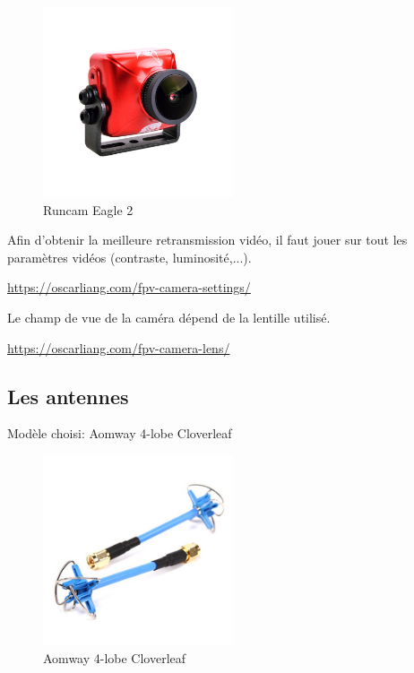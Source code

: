 \documentclass[a4paper, 11pt]{report}
\begin{document}
\begin{figure}[h]
	\begin{center}
		\includegraphics[width=0.5\textwidth]{images/camera.jpg}
		\caption{Runcam Eagle 2}
	\end{center}
\end{figure}

Afin d'obtenir la meilleure retransmission vidéo, il faut jouer sur tout les paramètres vidéos (contraste, luminosité,...).

\url{https://oscarliang.com/fpv-camera-settings/}

Le champ de vue de la caméra dépend de la lentille utilisé.

\url{https://oscarliang.com/fpv-camera-lens/}

\subsection{Les antennes}
Modèle choisi: Aomway 4-lobe Cloverleaf

\begin{figure}[h]
	\begin{center}
		\includegraphics[width=0.5\textwidth]{images/antenne.jpg}
		\caption{Aomway 4-lobe Cloverleaf}
	\end{center}
\end{figure}
\end{document}
